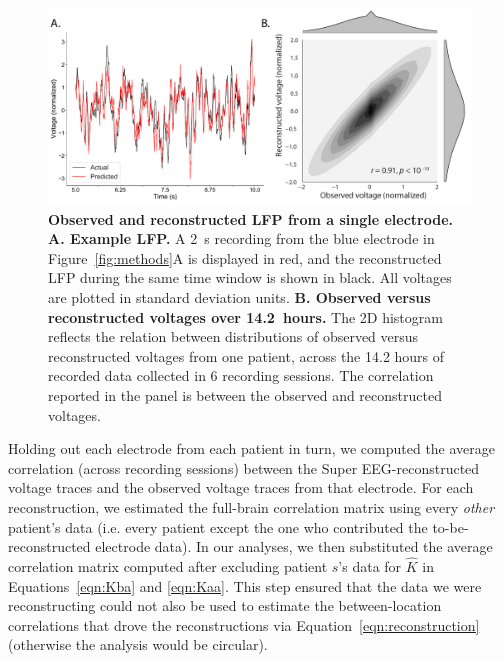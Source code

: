\documentclass[12pt]{article}
\begin{document}
\begin{figure}
  \centering
  \includegraphics[width=\textwidth]{figs/recon}
  \caption{\textbf{Observed and reconstructed LFP from a single
      electrode.} \textbf{A. Example LFP.}  A 2~s recording from the blue
    electrode in Figure~\ref{fig:methods}A is displayed in red, and
    the reconstructed LFP during the same time window is shown in
   black.  All voltages are plotted in standard deviation units.
    \textbf{B. Observed versus reconstructed voltages over 14.2~hours.}
    The 2D histogram reflects the relation between distributions of
    observed versus reconstructed voltages from one patient, across the
    14.2 hours of recorded data collected in 6 recording sessions.  The
    correlation reported in the panel is between the observed and reconstructed
    voltages.}
  \label{fig:recon}
\end{figure}

Holding out each electrode from each patient in turn, we computed the
average correlation (across recording sessions) between the Super
EEG-reconstructed voltage traces and the observed voltage traces from
that electrode.  For each reconstruction, we estimated the full-brain
correlation matrix using every \textit{other} patient's data
(i.e. every patient except the one who contributed the
to-be-reconstructed electrode data).  In our analyses, we then
substituted the average correlation matrix computed after excluding
patient $s$'s data for $\hat{K}$ in Equations~\ref{eqn:Kba} and
\ref{eqn:Kaa}.  This step ensured that the data we were reconstructing
could not also be used to estimate the between-location correlations
that drove the reconstructions via Equation~\ref{eqn:reconstruction}
(otherwise the analysis would be circular).
\end{document}
